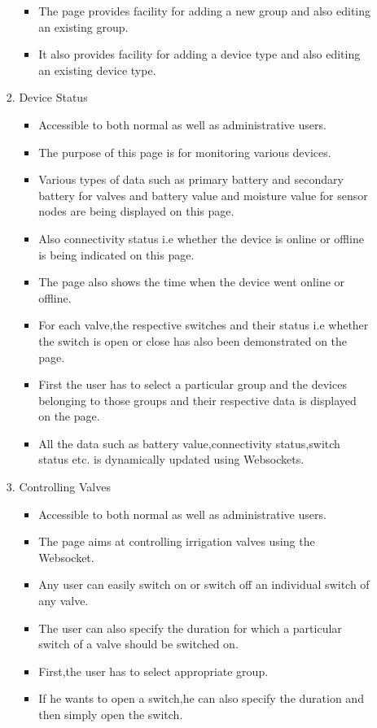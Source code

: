 \documentclass[a4paper,12pt,oneside]{book}
\begin{document}
\begin{enumerate}
\begin{itemize}
\begin{enumerate}
\begin{itemize}
                    \item{The page provides facility for adding a new group and also editing an existing group.}
                     \item{It also provides facility for adding a device type and also editing an existing device type.}
                \end{itemize}
             \item{Device Status}
                \begin{itemize}
                \item{Accessible to both normal as well as administrative users.}
               \item{The purpose of this page is for monitoring various devices.}
               \item{Various types of data such as primary battery and secondary battery for valves and battery value and moisture value for sensor nodes are being displayed on this page.}
              \item{Also connectivity status i.e whether the device is online or offline is being indicated on this page.}
               \item{The page also shows the time when the device went online or offline.}
               \item{For each valve,the respective switches and their status i.e whether the switch is open or close has also been demonstrated on the page.}
               \item{First the user has to select a particular group and the devices belonging to those groups and their respective data is displayed on the page.}
                \item{All the data such as battery value,connectivity status,switch status etc. is dynamically updated using Websockets.}
           \end{itemize}
            
            \item{Controlling Valves}
            \setlength\itemsep{0.2cm}
                \begin{itemize}
                    \item{Accessible to both normal as well as administrative users.}
                    \item{The page aims at controlling irrigation valves using the Websocket.}
                    \item{Any user can easily switch on or switch off an individual switch of any valve.}
                    \item{The user can also specify the duration for which a particular switch of a valve should be switched on.}
                    \item{First,the user has to select appropriate group.}
                    \item{If he wants to open a switch,he can also specify the duration and then simply open the switch.}
                \end{itemize}
                

\end{enumerate}
\end{itemize}
\end{enumerate}
\end{document}
